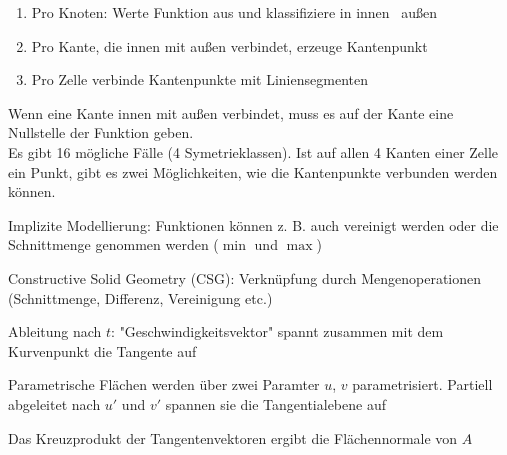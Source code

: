 \documentclass[12pt,landscape]{article}
\begin{document}
\begin{multicols}{3}
\begin{compactitem}
\begin{enumerate}
\item Pro Knoten: Werte Funktion aus und klassifiziere in innen \ außen
\item Pro Kante, die innen mit außen verbindet, erzeuge Kantenpunkt
\item Pro Zelle verbinde Kantenpunkte mit Liniensegmenten
\end{enumerate}
Wenn eine Kante innen mit außen verbindet, muss es auf der Kante eine Nullstelle der Funktion geben.\\
Es gibt 16 mögliche Fälle (4 Symetrieklassen). Ist auf allen 4 Kanten einer Zelle ein Punkt, gibt es zwei Möglichkeiten, wie die Kantenpunkte verbunden werden können.
\item Implizite Modellierung: Funktionen können z. B. auch vereinigt werden oder die Schnittmenge genommen werden ($\min$ und $\max$)
\item Constructive Solid Geometry (CSG): Verknüpfung durch Mengenoperationen (Schnittmenge, Differenz, Vereinigung etc.)
\item Ableitung nach $t$: "Geschwindigkeitsvektor" spannt zusammen mit dem Kurvenpunkt die Tangente auf
\item Parametrische Flächen werden über zwei Paramter $u$, $v$ parametrisiert. Partiell abgeleitet nach $u'$ und $v'$ spannen sie die Tangentialebene auf
\item Das Kreuzprodukt der Tangentenvektoren ergibt die Flächennormale von $A$
\end{compactitem}

\end{multicols}
\end{document}
